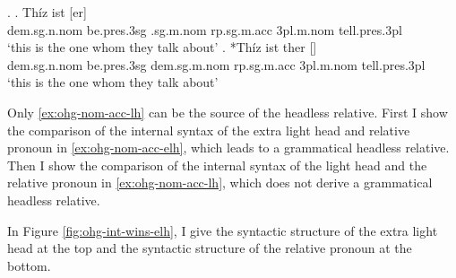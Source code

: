 \ex.\label{ex:ohg-nom-acc-rep}
\ag. Thíz ist [er]   \\
\ac{dem}.\ac{sg}.\ac{n}.\ac{nom} be.\ac{pres}.3\ac{sg}\scsub{[nom]} .\ac{sg}.\ac{m}.\ac{nom} \ac{rp}.\ac{sg}.\ac{m}.\ac{acc} 3\ac{pl}.\ac{m}.\ac{nom} tell.\ac{pres}.3\ac{pl}\scsub{[acc]}\\
`this is the one whom they talk about' \label{ex:ohg-nom-acc-elh}
\bg. *Thíz ist ther []  \\
\ac{dem}.\ac{sg}.\ac{n}.\ac{nom} be.\ac{pres}.3\ac{sg}\scsub{[nom]} \ac{dem}.\ac{sg}.\ac{m}.\ac{nom} \ac{rp}.\ac{sg}.\ac{m}.\ac{acc} 3\ac{pl}.\ac{m}.\ac{nom} tell.\ac{pres}.3\ac{pl}\scsub{[acc]}\\
`this is the one whom they talk about' \label{ex:ohg-nom-acc-lh}

Only \ref{ex:ohg-nom-acc-lh} can be the source of the headless relative. First I show the comparison of the internal syntax of the extra light head and relative pronoun in \ref{ex:ohg-nom-acc-elh}, which leads to a grammatical headless relative. Then I show the comparison of the internal syntax of the light head and the relative pronoun in \ref{ex:ohg-nom-acc-lh}, which does not derive a grammatical headless relative.

In Figure \ref{fig:ohg-int-wins-elh}, I give the syntactic structure of the extra light head at the top and the syntactic structure of the relative pronoun at the bottom.

